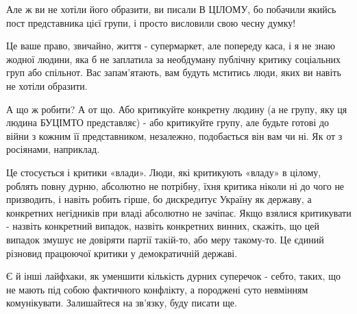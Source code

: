 Але ж ви не хотіли його образити, ви писали В ЦІЛОМУ, бо побачили якийсь пост
представника цієї групи, і просто висловили свою чесну думку! 

Це ваше право, звичайно, життя - супермаркет, але попереду каса, і я не знаю
жодної людини, яка б не заплатила за необдуману публічну критику соціальних
груп або спільнот. Вас запам'ятають, вам будуть мститись люди, яких ви навіть
не хотіли образити.

А що ж робити? А от що. Або критикуйте конкретну людину (а не групу, яку ця
людина БУЦІМТО представляє) - або критикуйте групу, але будьте готові до війни
з кожним її представником, незалежно, подобається він вам чи ні. Як от з
росіянами, наприклад. 

Це стосується і критики «влади». Люди, які критикують «владу» в цілому, роблять
повну дурню, абсолютно не потрібну, їхня критика ніколи ні до чого не
призводить, і навіть робить гірше, бо дискредитує Україну як державу, а
конкретних негідників при владі абсолютно не зачіпає. Якщо взялися критикувати
- назвіть конкретний випадок, назвіть конкретних винних, скажіть, що цей
випадок змушує не довіряти партії такій-то, або меру такому-то. Це єдиний
різновид працюючої критики у демократичній державі.

Є й інші лайфхаки, як уменшити кількість дурних суперечок - себто, таких, що не
мають під собою фактичного конфлікту, а породжені суто невмінням комунікувати.
Залишайтеся на зв'язку, буду писати ще.

